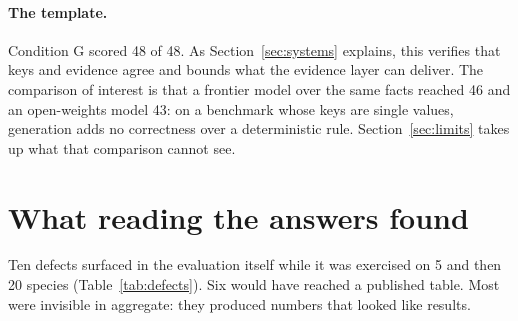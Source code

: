 \documentclass[11pt,a4paper]{article}
\newenvironment{prelim}{\par}{\par}
\begin{document}
\begin{prelim}
\paragraph{The template.} Condition G scored 48 of 48. As Section~\ref{sec:systems}
explains, this verifies that keys and evidence agree and bounds what the evidence
layer can deliver. The comparison of interest is that a frontier model over the same
facts reached 46 and an open-weights model 43: on a benchmark whose keys are single
values, generation adds no correctness over a deterministic rule.
Section~\ref{sec:limits} takes up what that comparison cannot see.
\end{prelim}

\section{What reading the answers found}\label{sec:defects}

Ten defects surfaced in the evaluation itself while it was exercised on 5 and then 20
species (Table~\ref{tab:defects}). Six would have reached a published table. Most
were invisible in aggregate: they produced numbers that looked like results.
\end{document}
